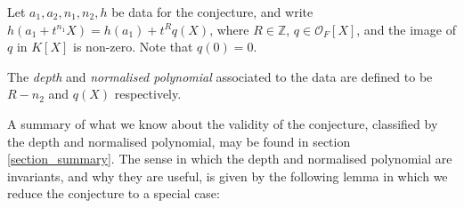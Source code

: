 \documentclass{lmsMODIFIED}
\newcommand{\bb}[1]{\mathbb{#1}}
\newcommand{\roi}{\mathcal{O}}
\begin{document}
\begin{definition}
Let $a_1,a_2,n_1,n_2,h$ be data for the conjecture, and write $h(a_1+t^{n_1}X)=h(a_1)+t^Rq(X)$, where $R\in\bb{Z}$, $q\in\roi_{F}[X]$, and the image of $q$ in $ K [X]$ is non-zero. Note that $q(0)=0$.

The \emph{depth} and \emph{normalised polynomial} associated to the data are defined to be $R-n_2$ and $q(X)$ respectively.
\end{definition}

A summary of what we know about the validity of the conjecture, classified by the depth and normalised polynomial, may be found in section \ref{section_summary}. The sense in which the depth and normalised polynomial are invariants, and why they are useful, is given by the following lemma in which we reduce the conjecture to a special case:
\end{document}

